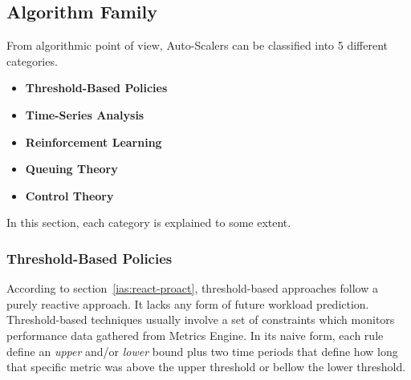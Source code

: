 \clearpage
\subsection{Algorithm Family}
\label{ias:alg-fam}

From algorithmic point of view, Auto-Scalers can be classified into 5 different categories.
\begin{itemize}
    \item \textbf{Threshold-Based Policies}
    \item \textbf{Time-Series Analysis}
    \item \textbf{Reinforcement Learning}
    \item \textbf{Queuing Theory}
    \item \textbf{Control Theory}
\end{itemize}
In this section, each category is explained to some extent.

\subsubsection{Threshold-Based Policies}

According to section~\ref{ias:react-proact}, threshold-based approaches follow a purely  reactive approach. It lacks any form of future workload prediction. Threshold-based techniques usually involve a set of constraints which monitors performance data gathered from Metrics Engine. In its naive form, each rule define an \emph{upper} and/or \emph{lower} bound plus two time periods that define how long that specific metric was above the upper threshold or bellow the lower threshold.

